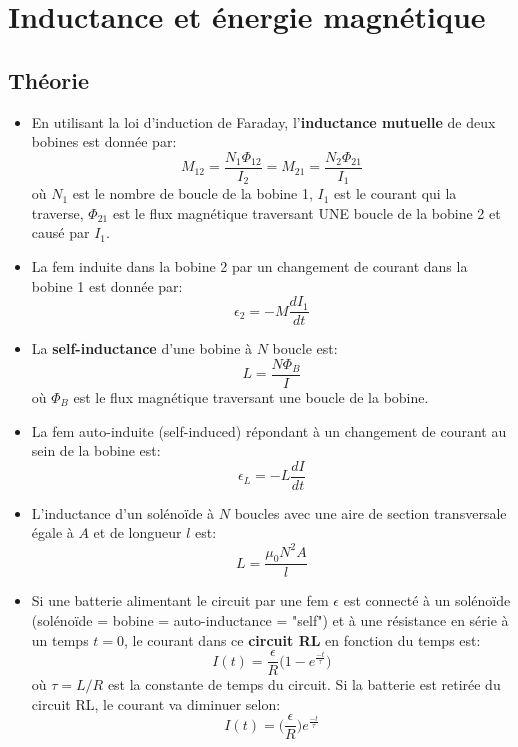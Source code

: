 \documentclass[a4paper]{article}
\begin{document}
\section{Inductance et énergie magnétique}









\subsection{Théorie}







\begin{itemize}
    \item En utilisant la loi d'induction de Faraday, l'\textbf{inductance mutuelle} de deux bobines est donnée par: 
\[ M_{12} = \frac{N_1 \Phi_{12}}{I_2} = M_{21} = \frac{N_2 \Phi_{21}}{I_1} \]
où $ N_1 $ est le nombre de boucle de la bobine 1, $ I_1 $ est le courant qui la traverse, $ \Phi_{21} $ est le flux magnétique traversant UNE boucle de la bobine 2 et causé par $ I_1 $.
    \item La fem induite dans la bobine 2 par un changement de courant dans la bobine 1 est donnée par: 
\[ \epsilon_2 = - M \frac{d I_1}{d t} \]
    \item La \textbf{self-inductance} d'une bobine à $ N $ boucle est: 
\[ L = \frac{N \Phi_B}{I} \]
où $ \Phi_B $ est le flux magnétique traversant une boucle de la bobine.
    \item La fem auto-induite (self-induced) répondant à un changement de courant au sein de la bobine est: 
\[ \epsilon_L = - L \frac{d I}{d t} \]
    \item L'inductance d'un solénoïde à $ N $ boucles avec une aire de section transversale égale à $ A $ et de longueur $ l $ est: 
\[ L = \frac{\mu_0 N^2 A}{l} \]
    \item Si une batterie alimentant le circuit par une fem $ \epsilon $ est connecté à un solénoïde (solénoïde = bobine = 
auto-inductance = "self") et à une résistance en série à un temps $ t = 0 $, le courant dans ce \textbf{circuit RL} en fonction du temps est: \[ I(t) = \frac{\epsilon}{R} \Big( 1 - e^{\frac{-t}{\tau}} \Big) \]
où $ \tau = L / R $ est la constante de temps du circuit. Si la batterie est retirée du circuit RL, le courant va diminuer selon: 
\[ I(t) = \Big( \frac{\epsilon}{R} \Big) e^{\frac{-t}{\tau}} \]

\end{itemize}
\end{document}
